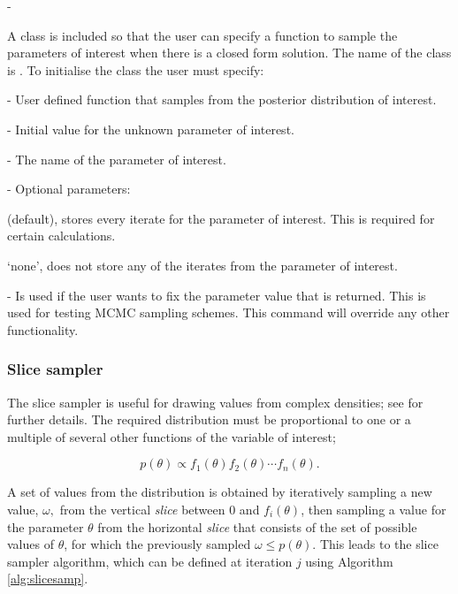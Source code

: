 -\documentclass[article]{jss}
\begin{document}
A class is included so that the user can specify a function to sample
the parameters of interest when there is a closed form solution. The
name of the class is . To initialise the class the
user must specify:
\begin{description}
\item {} - User defined function that samples from the
  posterior distribution of interest.
\item {} - Initial value for the unknown parameter of
  interest.
\item {} - The name of the parameter of interest.
\item {} - Optional parameters:

\begin{description}
\item {}
  \begin{description}
  \item {} (default), stores every iterate for the parameter
    of interest. This is required for certain calculations.
  \item `none', does not store any of the iterates from the parameter
    of interest.
  \end{description}
\item {} - Is used if the user wants to fix the
  parameter value that is returned. This is used for testing MCMC
  sampling schemes.  This command will override any other
  functionality.
\end{description}
\end{description}

\subsubsection{Slice sampler}

The slice sampler is useful for drawing values from complex densities;
see \citet{Radford2003} for further details. The required distribution
must be proportional to one or a multiple of several other functions
of the variable of interest;

\[p(\theta)\propto f_{1}(\theta)f_{2}(\theta)\cdots f_{n}(\theta).\]

A set of values from the distribution is obtained by iteratively
sampling a new value, $\omega,$ from the vertical \emph{slice} between
0 and $f_{i}(\theta)$, then sampling a value for the parameter
$\theta$ from the horizontal \emph{slice} that consists of the set of
possible values of $\theta$, for which the previously sampled
$\omega\le p(\theta)$.  This leads to the slice sampler algorithm,
which can be defined at iteration $j$ using Algorithm
\ref{alg:slicesamp}.
\end{document}
